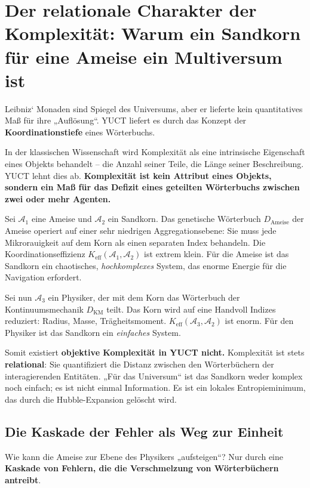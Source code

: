 \documentclass[12pt,a4paper]{article}
\newcommand{\Keff}{K_{\mathrm{eff}}}
\begin{document}
	\section{Der relationale Charakter der Komplexität: Warum ein Sandkorn für eine Ameise ein Multiversum ist}
	\label{sec:relational-complexity}
	
	Leibniz‘ Monaden sind Spiegel des Universums, aber er lieferte kein quantitatives Maß für ihre „Auflösung“. YUCT liefert es durch das Konzept der \textbf{Koordinationstiefe} eines Wörterbuchs.
	
	In der klassischen Wissenschaft wird Komplexität als eine intrinsische Eigenschaft eines Objekts behandelt – die Anzahl seiner Teile, die Länge seiner Beschreibung. YUCT lehnt dies ab. \textbf{Komplexität ist kein Attribut eines Objekts, sondern ein Maß für das Defizit eines geteilten Wörterbuchs zwischen zwei oder mehr Agenten.}
	
	Sei \(\mathcal{A}_1\) eine Ameise und \(\mathcal{A}_2\) ein Sandkorn. Das genetische Wörterbuch \(D_{\text{Ameise}}\) der Ameise operiert auf einer sehr niedrigen Aggregationsebene: Sie muss jede Mikrorauigkeit auf dem Korn als einen separaten Index behandeln. Die Koordinationseffizienz \(\Keff(\mathcal{A}_1, \mathcal{A}_2)\) ist extrem klein. Für die Ameise ist das Sandkorn ein chaotisches, \emph{hochkomplexes} System, das enorme Energie für die Navigation erfordert.
	
	Sei nun \(\mathcal{A}_3\) ein Physiker, der mit dem Korn das Wörterbuch der Kontinuumsmechanik \(D_{\text{KM}}\) teilt. Das Korn wird auf eine Handvoll Indizes reduziert: Radius, Masse, Trägheitsmoment. \(\Keff(\mathcal{A}_3, \mathcal{A}_2)\) ist enorm. Für den Physiker ist das Sandkorn ein \emph{einfaches} System.
	
	Somit existiert \textbf{objektive Komplexität in YUCT nicht.} Komplexität ist stets \textbf{relational}: Sie quantifiziert die Distanz zwischen den Wörterbüchern der interagierenden Entitäten. „Für das Universum“ ist das Sandkorn weder komplex noch einfach; es ist nicht einmal Information. Es ist ein lokales Entropieminimum, das durch die Hubble-Expansion gelöscht wird.
	
	\subsection{Die Kaskade der Fehler als Weg zur Einheit}
	\label{subsec:cascade}
	
	Wie kann die Ameise zur Ebene des Physikers „aufsteigen“? Nur durch eine \textbf{Kaskade von Fehlern, die die Verschmelzung von Wörterbüchern antreibt}.
	
\end{document}
